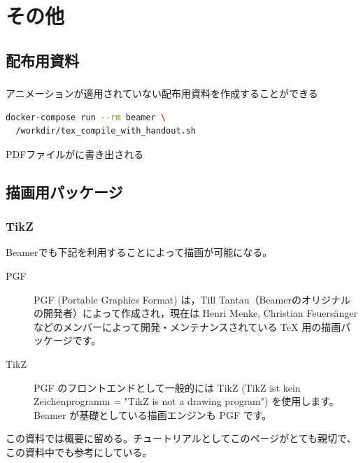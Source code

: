 \section{その他}
\subsection{配布用資料}
\begin{frame}[fragile]
  \frametitle{\insertsubsection}
  アニメーションが適用されていない配布用資料を作成することができる
  \scriptsize
  \begin{lstlisting}[caption=丁寧, language=sh]
  docker-compose run --rm beamer \
  /workdir/tex_compile_with_handout.sh
  \end{lstlisting}
  \normalsize
    PDFファイルがに書き出される
\end{frame}

\subsection{描画用パッケージ}
\begin{frame}{\insertsubsetion}
  \frametitle{\insertsubsection TikZ}
  \footnotesize
  Beamerでも下記を利用することによって描画が可能になる。
  \smallskip
    \begin{description}
        \item[PGF] PGF (Portable Graphics Format) は，Till Tantau（Beamerのオリジナルの開発者）によって作成され，現在は Henri Menke, Christian Feuersänger などのメンバーによって開発・メンテナンスされている TeX 用の描画パッケージです。 \cite{TikZTeXW51:online}
        \item[TikZ] PGF のフロントエンドとして一般的には TikZ (TikZ ist kein Zeichenprogramm = "TikZ is not a drawing program") を使用します。 Beamer が基礎としている描画エンジンも PGF です。 \cite{TikZTeXW51:online}
    \end{description}
  \smallskip
    この資料では概要に留める。チュートリアルとしてこのページ\cite{TikZTas85:online}がとても親切で、この資料中でも参考にしている。
\end{frame}

